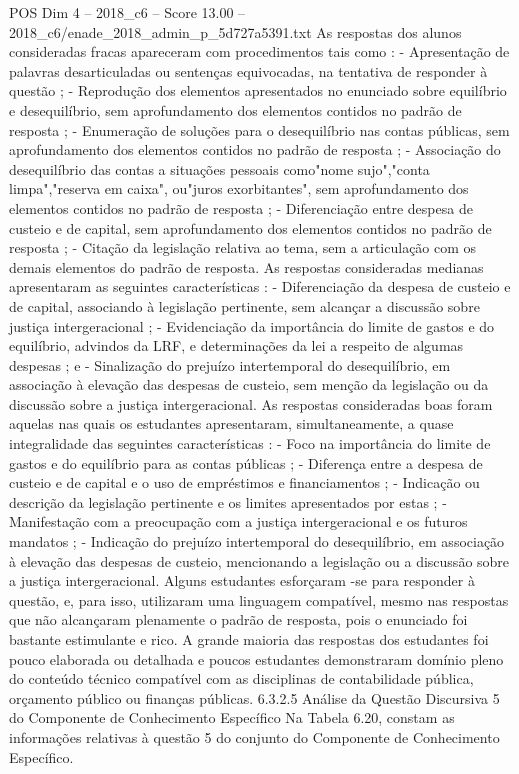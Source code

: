 \begin{textsample}{POS Dim 4 – 2018\_c6 – Score 13.00 – 2018\_c6/enade\_2018\_admin\_p\_5d727a5391.txt}
As respostas dos alunos consideradas fracas apareceram com procedimentos tais como : - Apresentação de palavras desarticuladas ou sentenças equivocadas, na tentativa de responder à questão ; - Reprodução dos elementos apresentados no enunciado sobre equilíbrio e desequilíbrio, sem aprofundamento dos elementos contidos no padrão de resposta ; - Enumeração de soluções para o desequilíbrio nas contas públicas, sem aprofundamento dos elementos contidos no padrão de resposta ; - Associação do desequilíbrio das contas a situações pessoais como"nome sujo","conta limpa","reserva em caixa", ou"juros exorbitantes", sem aprofundamento dos elementos contidos no padrão de resposta ; - Diferenciação entre despesa de custeio e de capital, sem aprofundamento dos elementos contidos no padrão de resposta ; - Citação da legislação relativa ao tema, sem a articulação com os demais elementos do padrão de resposta.
As respostas consideradas medianas apresentaram as seguintes características : - Diferenciação da despesa de custeio e de capital, associando à legislação pertinente, sem alcançar a discussão sobre justiça intergeracional ; - Evidenciação da importância do limite de gastos e do equilíbrio, advindos da LRF, e determinações da lei a respeito de algumas despesas ; e - Sinalização do prejuízo intertemporal do desequilíbrio, em associação à elevação das despesas de custeio, sem menção da legislação ou da discussão sobre a justiça intergeracional.
As respostas consideradas boas foram aquelas nas quais os estudantes apresentaram, simultaneamente, a quase integralidade das seguintes características : - Foco na importância do limite de gastos e do equilíbrio para as contas públicas ; - Diferença entre a despesa de custeio e de capital e o uso de empréstimos e financiamentos ; - Indicação ou descrição da legislação pertinente e os limites apresentados por estas ; - Manifestação com a preocupação com a justiça intergeracional e os futuros mandatos ; - Indicação do prejuízo intertemporal do desequilíbrio, em associação à elevação das despesas de custeio, mencionando a legislação ou a discussão sobre a justiça intergeracional.
Alguns estudantes esforçaram -se para responder à questão, e, para isso, utilizaram uma linguagem compatível, mesmo nas respostas que não alcançaram plenamente o padrão de resposta, pois o enunciado foi bastante estimulante e rico.
A grande maioria das respostas dos estudantes foi pouco elaborada ou detalhada e poucos estudantes demonstraram domínio pleno do conteúdo técnico compatível com as disciplinas de contabilidade pública, orçamento público ou finanças públicas. 6.3.2.5 Análise da Questão Discursiva 5 do Componente de Conhecimento Específico Na Tabela 6.20, constam as informações relativas à questão 5 do conjunto do Componente de Conhecimento Específico.

\end{textsample}
